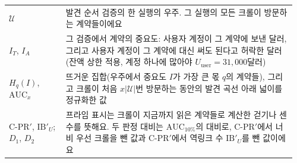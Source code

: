 \begin{longtable}{@{}>{\raggedright\arraybackslash}p{0.19\linewidth}p{0.77\linewidth}@{}}
$\mathcal{U}$ & 발견 순서 검증의 한 실행의 우주. 그 실행의 모든 크롤이 방문하는 계약들이에요 \\
$I_T$, $I_A$ & 그 검증에서 계약의 중요도: 사용자 계정이 그 계약에 보낸 달러, 그리고 사용자 계정이 그 계약에 대신 써도 된다고 허락한 달러(잔액 상한 적용, 계정 하나에 많아야 $U_{\mathrm{user}}=31{,}000$달러) \\
$H_q(I)$, $\mathrm{AUC}_{x}$ & 뜨거운 집합(우주에서 중요도 $I$가 가장 큰 몫 $q$의 계약들), 그리고 크롤이 처음 $x|\mathcal{U}|$번 방문하는 동안의 발견 곡선 아래 넓이를 정규화한 값 \\
\mbox{C-PR}$'$, $\mathrm{IB}'_U$; $D_1$, $D_2$ & 프라임 표시는 크롤이 지금까지 읽은 계약들로 계산한 걷기나 센 수를 뜻해요. 두 판정 대비는 $\mathrm{AUC}_{10\%}$의 대비로, \mbox{C-PR}$'$에서 너비 우선 크롤을 뺀 값과 \mbox{C-PR}$'$에서 역링크 수 $\mathrm{IB}'_U$를 뺀 값이에요 \\
\end{longtable}
\endgroup

\let\thetable\FrontMatterSavedThetable
